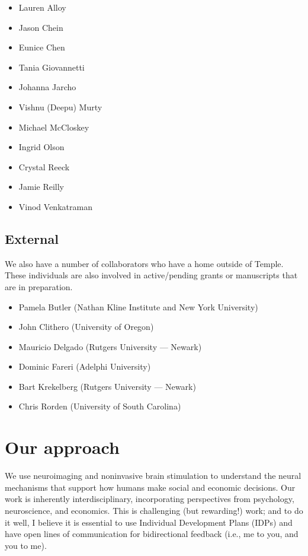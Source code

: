 \documentclass[letterpaper,12pt,oneside]{memoir}
\begin{document}
\begin{multicols}{2}
\begin{itemize}[noitemsep,nolistsep]
\item Lauren Alloy
\item Jason Chein
\item Eunice Chen
\item Tania Giovannetti
\item Johanna Jarcho
\item Vishnu (Deepu) Murty
\item Michael McCloskey
\item Ingrid Olson
\item Crystal Reeck
\item Jamie Reilly
\item Vinod Venkatraman
\end{itemize}
\end{multicols}

\subsection{External}

We also have a number of collaborators who have a home outside of Temple. These individuals are also involved in active/pending grants or manuscripts that are in preparation. \\

\begin{itemize}[noitemsep,nolistsep]
\item Pamela Butler (Nathan Kline Institute and New York University)
\item John Clithero (University of Oregon)
\item Mauricio Delgado (Rutgers University --- Newark)
\item Dominic Fareri (Adelphi University)
\item Bart Krekelberg (Rutgers University --- Newark)
\item Chris Rorden (University of South Carolina) 
\end{itemize}


\section{Our approach}
We use neuroimaging and noninvasive brain stimulation to understand the neural mechanisms that support how humans make social and economic decisions. Our work is inherently interdisciplinary, incorporating perspectives from psychology, neuroscience, and economics. This is challenging (but rewarding!) work; and to do it well, I believe it is essential to use Individual Development Plans (IDPs) and have open lines of communication for bidirectional feedback (i.e., me to you, and you to me). 
\end{document}
